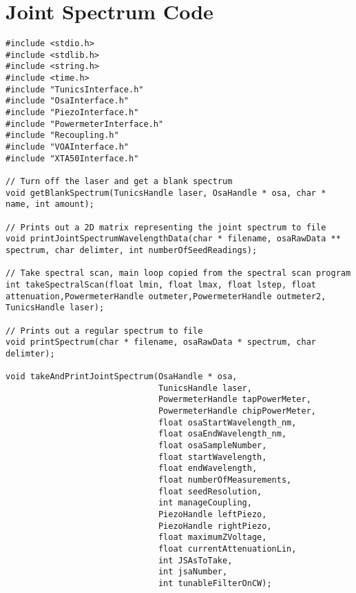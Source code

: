 \newpage
\section{Joint Spectrum Code}
\begin{lstlisting}
#include <stdio.h>
#include <stdlib.h>
#include <string.h>
#include <time.h>
#include "TunicsInterface.h"
#include "OsaInterface.h"
#include "PiezoInterface.h"
#include "PowermeterInterface.h"
#include "Recoupling.h"
#include "VOAInterface.h"
#include "XTA50Interface.h"

// Turn off the laser and get a blank spectrum
void getBlankSpectrum(TunicsHandle laser, OsaHandle * osa, char * name, int amount);

// Prints out a 2D matrix representing the joint spectrum to file
void printJointSpectrumWavelengthData(char * filename, osaRawData ** spectrum, char delimter, int numberOfSeedReadings);

// Take spectral scan, main loop copied from the spectral scan program
int takeSpectralScan(float lmin, float lmax, float lstep, float attenuation,PowermeterHandle outmeter,PowermeterHandle outmeter2, TunicsHandle laser);

// Prints out a regular spectrum to file
void printSpectrum(char * filename, osaRawData * spectrum, char delimter);

void takeAndPrintJointSpectrum(OsaHandle * osa,
                               TunicsHandle laser,
                               PowermeterHandle tapPowerMeter,
                               PowermeterHandle chipPowerMeter,
                               float osaStartWavelength_nm,
                               float osaEndWavelength_nm,
                               float osaSampleNumber,
                               float startWavelength,
                               float endWavelength,
                               float numberOfMeasurements,
                               float seedResolution,
                               int manageCoupling,
                               PiezoHandle leftPiezo,
                               PiezoHandle rightPiezo,
                               float maximumZVoltage,
                               float currentAttenuationLin,
                               int JSAsToTake,
                               int jsaNumber,
                               int tunableFilterOnCW);


\end{lstlisting}
